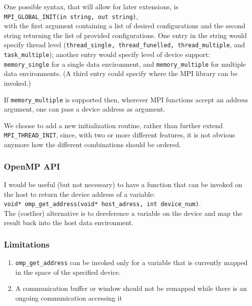 One possible 
syntax, that will allow for later extensions, is
\\
\texttt{MPI\_GLOBAL\_INIT(in string, out string)},
\\ 
with the first argument 
containing a list of desired configurations and the second string returning the 
list of provided configurations. One entry in the string would specify thread 
level (\texttt{thread\_single, thread\_funelled, thread\_multiple}, and 
\texttt{task\_multiple}); another entry would specify level of device support: 
\texttt{memory\_single} for a single data environment, and 
\texttt{memory\_multiple} for multiple data environments.  (A third entry could 
specify where the MPI library can be invoked.)

If \texttt{memory\_multiple} is supported then, wherever MPI functions accept 
an address 
argument, one can pass a device address as argument.

We choose to add a new initialization routine, rather than further extend 
\texttt{MPI\_THREAD\_INIT}, since, with two or more different features, it is 
not 
obvious anymore how the different combinations should be ordered.

\subsubsection{OpenMP API}

I would be useful (but not necessary) to have a function that can be invoked on 
the host to return the device address of a variable: 
\\
\texttt{void* omp\_get\_address(void* host\_adress, int device\_num)}.\\
The (costlier) 
alternative is to dereference a variable on the device and map the result back 
into the host data environment.

\subsubsection{Limitations}

\begin{enumerate}
	\item 
	\texttt{omp\_get\_address} can be invoked only for a variable that is 
	currently mapped in the space of the specified device.
	\item 
	A communication buffer or window should not be remapped while there is an 
	ongoing communication accessing it
\end{enumerate}


